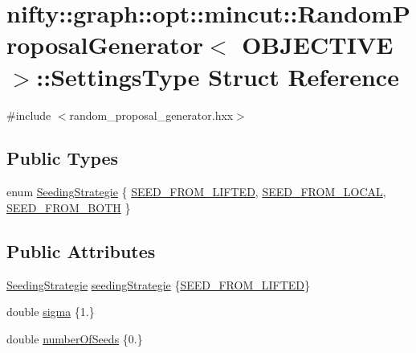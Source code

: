 \hypertarget{structnifty_1_1graph_1_1opt_1_1mincut_1_1RandomProposalGenerator_1_1SettingsType}{}\section{nifty\+:\+:graph\+:\+:opt\+:\+:mincut\+:\+:Random\+Proposal\+Generator$<$ O\+B\+J\+E\+C\+T\+I\+VE $>$\+:\+:Settings\+Type Struct Reference}
\label{structnifty_1_1graph_1_1opt_1_1mincut_1_1RandomProposalGenerator_1_1SettingsType}


{\ttfamily \#include $<$random\+\_\+proposal\+\_\+generator.\+hxx$>$}

\subsection*{Public Types}
\begin{DoxyCompactItemize}
\item 
enum \hyperlink{structnifty_1_1graph_1_1opt_1_1mincut_1_1RandomProposalGenerator_1_1SettingsType_ae768919b1348c58e3c8c77b25fee1d1e}{Seeding\+Strategie} \{ \hyperlink{structnifty_1_1graph_1_1opt_1_1mincut_1_1RandomProposalGenerator_1_1SettingsType_ae768919b1348c58e3c8c77b25fee1d1ea4bde75d47884af322ee601dc12bf90e7}{S\+E\+E\+D\+\_\+\+F\+R\+O\+M\+\_\+\+L\+I\+F\+T\+ED}, 
\hyperlink{structnifty_1_1graph_1_1opt_1_1mincut_1_1RandomProposalGenerator_1_1SettingsType_ae768919b1348c58e3c8c77b25fee1d1ea2516565b11f5e1944f305ba7598e113a}{S\+E\+E\+D\+\_\+\+F\+R\+O\+M\+\_\+\+L\+O\+C\+AL}, 
\hyperlink{structnifty_1_1graph_1_1opt_1_1mincut_1_1RandomProposalGenerator_1_1SettingsType_ae768919b1348c58e3c8c77b25fee1d1ead8f87239cc943646edd57fb10112f0d5}{S\+E\+E\+D\+\_\+\+F\+R\+O\+M\+\_\+\+B\+O\+TH}
 \}
\end{DoxyCompactItemize}
\subsection*{Public Attributes}
\begin{DoxyCompactItemize}
\item 
\hyperlink{structnifty_1_1graph_1_1opt_1_1mincut_1_1RandomProposalGenerator_1_1SettingsType_ae768919b1348c58e3c8c77b25fee1d1e}{Seeding\+Strategie} \hyperlink{structnifty_1_1graph_1_1opt_1_1mincut_1_1RandomProposalGenerator_1_1SettingsType_aa59689137cb575420357136e424393bc}{seeding\+Strategie} \{\hyperlink{structnifty_1_1graph_1_1opt_1_1mincut_1_1RandomProposalGenerator_1_1SettingsType_ae768919b1348c58e3c8c77b25fee1d1ea4bde75d47884af322ee601dc12bf90e7}{S\+E\+E\+D\+\_\+\+F\+R\+O\+M\+\_\+\+L\+I\+F\+T\+ED}\}
\item 
double \hyperlink{structnifty_1_1graph_1_1opt_1_1mincut_1_1RandomProposalGenerator_1_1SettingsType_a949050fd4426f0b54dc1add474eda7b7}{sigma} \{1.\}
\item 
double \hyperlink{structnifty_1_1graph_1_1opt_1_1mincut_1_1RandomProposalGenerator_1_1SettingsType_a575ff60807f8f957e80526b7a6cf3e14}{number\+Of\+Seeds} \{0.\}
\end{DoxyCompactItemize}


